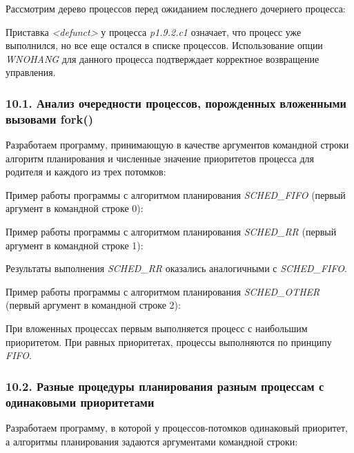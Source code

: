 \documentclass[14pt,a4paper,report]{report}
\begin{document}
Рассмотрим дерево процессов перед ожиданием последнего дочернего процесса:



Приставка \emph{<defunct>} у процесса \emph{p1.9.2.c1} означает, что процесс уже выполнился, но все еще остался в списке процессов. Использование опции \emph{WNOHANG} для данного процесса подтверждает корректное возвращение управления.

\subsubsection{10.1. Анализ очередности процессов, порожденных вложенными вызовами fork()}

Разработаем программу, принимающую в качестве аргументов командной строки алгоритм планирования и численные значение приоритетов процесса для родителя и каждого из трех потомков:



Пример работы программы с алгоритмом планирования \emph{SCHED\_FIFO} (первый аргумент в командной строке 0):



Пример работы программы с алгоритмом планирования \emph{SCHED\_RR} (первый аргумент в командной строке 1):



Результаты выполнения \emph{SCHED\_RR} оказались аналогичными с \emph{SCHED\_FIFO}.

Пример работы программы с алгоритмом планирования \emph{SCHED\_OTHER} (первый аргумент в командной строке 2):



При вложенных процессах первым выполняется процесс с наибольшим приоритетом. При равных приоритетах, процессы выполняются по принципу \emph{FIFO}.

\subsubsection{10.2. Разные процедуры планирования разным процессам с одинаковыми приоритетами}

Разработаем программу, в которой у процессов-потомков одинаковый приоритет, а алгоритмы планирования задаются аргументами командной строки:


\end{document}

